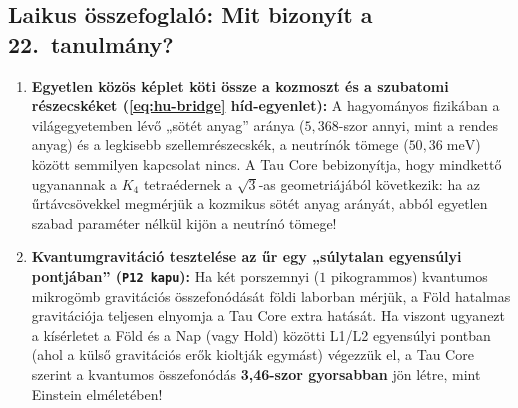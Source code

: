 \documentclass[11pt,a4paper]{article}
\begin{document}
\subsection*{Laikus összefoglaló: Mit bizonyít a 22.\ tanulmány?}
\begin{enumerate}[leftmargin=1.6em,itemsep=2pt]
\item \textbf{Egyetlen közös képlet köti össze a kozmoszt és a szubatomi részecskéket (\eqref{eq:hu-bridge} híd-egyenlet):} A hagyományos fizikában a világegyetemben lévő „sötét anyag” aránya ($5{,}368$-szor annyi, mint a rendes anyag) és a legkisebb szellemrészecskék, a neutrínók tömege ($50{,}36\;\mathrm{meV}$) között semmilyen kapcsolat nincs. A Tau Core bebizonyítja, hogy mindkettő ugyanannak a $K_4$ tetraédernek a $\sqrt{3}$-as geometriájából következik: ha az űrtávcsövekkel megmérjük a kozmikus sötét anyag arányát, abból egyetlen szabad paraméter nélkül kijön a neutrínó tömege!
\item \textbf{Kvantumgravitáció tesztelése az űr egy „súlytalan egyensúlyi pontjában” (\texttt{P12 kapu}):} Ha két porszemnyi ($1$ pikogrammos) kvantumos mikrogömb gravitációs összefonódását földi laborban mérjük, a Föld hatalmas gravitációja teljesen elnyomja a Tau Core extra hatását. Ha viszont ugyanezt a kísérletet a Föld és a Nap (vagy Hold) közötti L1/L2 egyensúlyi pontban (ahol a külső gravitációs erők kioltják egymást) végezzük el, a Tau Core szerint a kvantumos összefonódás \textbf{3,46-szor gyorsabban} jön létre, mint Einstein elméletében!
\end{enumerate}
\end{document}
